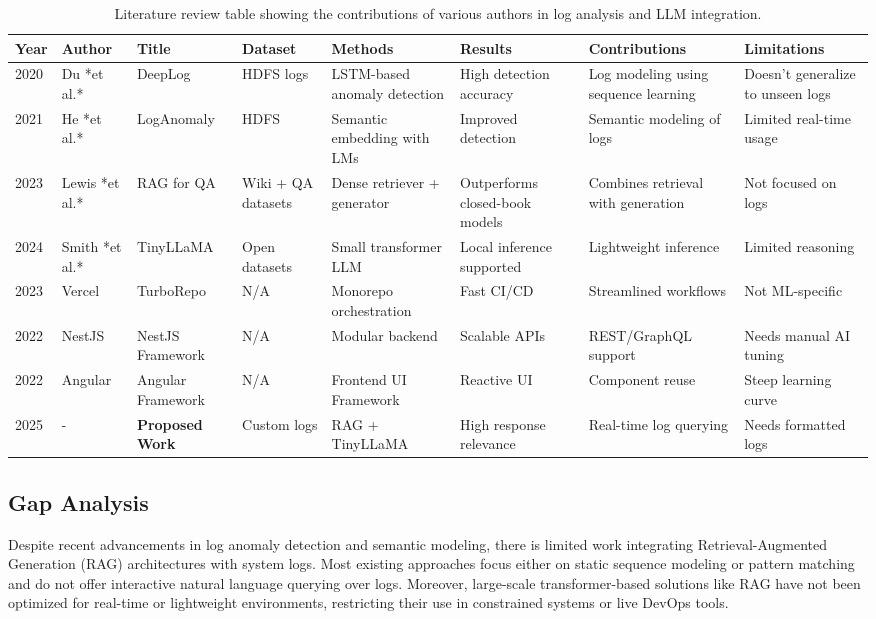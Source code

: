 \documentclass[conference]{IEEEtran}
\begin{document}
\begin{table}[!ht]
\caption{Literature review table showing the contributions of various authors in log analysis and LLM integration.}
\label{tab:LiteratureSummary}
\begin{tabularx}{\textwidth}{|p{1.1cm}|X|X|X|X|X|X|X|}
\hline
\textbf{Year} & \textbf{Author} & \textbf{Title} & \textbf{Dataset} & \textbf{Methods} & \textbf{Results} & \textbf{Contributions} & \textbf{Limitations} \\
\hline
2020 & Du *et al.* \cite{du2020deeplog} & DeepLog & HDFS logs & LSTM-based anomaly detection & High detection accuracy & Log modeling using sequence learning & Doesn’t generalize to unseen logs \\
\hline
2021 & He *et al.* \cite{he2021loganomaly} & LogAnomaly & HDFS & Semantic embedding with LMs & Improved detection & Semantic modeling of logs & Limited real-time usage \\
\hline
2023 & Lewis *et al.* \cite{lewis2023ragqa} & RAG for QA & Wiki + QA datasets & Dense retriever + generator & Outperforms closed-book models & Combines retrieval with generation & Not focused on logs \\
\hline
2024 & Smith *et al.* \cite{smith2024tinyllama} & TinyLLaMA & Open datasets & Small transformer LLM & Local inference supported & Lightweight inference & Limited reasoning \\
\hline
2023 & Vercel \cite{turbo2023repo} & TurboRepo & N/A & Monorepo orchestration & Fast CI/CD & Streamlined workflows & Not ML-specific \\
\hline
2022 & NestJS \cite{nestjs2022framework} & NestJS Framework & N/A & Modular backend & Scalable APIs & REST/GraphQL support & Needs manual AI tuning \\
\hline
2022 & Angular \cite{angular2022framework} & Angular Framework & N/A & Frontend UI Framework & Reactive UI & Component reuse & Steep learning curve \\
\hline
2025 & - & \textbf{Proposed Work} & Custom logs & RAG + TinyLLaMA & High response relevance & Real-time log querying & Needs formatted logs \\
\hline
\end{tabularx}
\end{table}

\subsection{Gap Analysis}

Despite recent advancements in log anomaly detection and semantic modeling, there is limited work integrating Retrieval-Augmented Generation (RAG) architectures with system logs. Most existing approaches focus either on static sequence modeling or pattern matching and do not offer interactive natural language querying over logs. Moreover, large-scale transformer-based solutions like RAG have not been optimized for real-time or lightweight environments, restricting their use in constrained systems or live DevOps tools.
\end{document}
